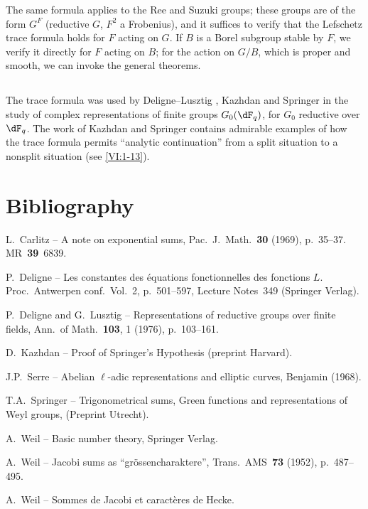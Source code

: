 \documentclass[oneside]{book}
\newcounter{char}
\theoremstyle{sga-source}
\theoremstyle{sga-source-dash}
\theoremstyle{sga-source-dotdash}
\theoremstyle{sga-source-number-note-dash}
\theoremstyle{sga-source-note-number-dotdash}
\theoremstyle{sga-source-example-dotdash}
\theoremstyle{sga-source-inline-number}
\theoremstyle{sga-source-bare-number}
\theoremstyle{sga-source}
\newcommand{\PrintPage}[1]{}\newcommand{\MathPage}[1]{}\newcommand{\PrintCite}[2]{#1}\newcommand{\var}[3]{#2}
\begin{document}
\PrintPage{231}
The same formula applies to the Ree and Suzuki groups; these groups are 
of the form $G^F$ (reductive $G$, $F^2$ a Frobenius), and it suffices to 
verify that the Lefschetz trace formula holds for $F$ acting 
on $G$. If $B$ is a Borel subgroup stable by $F$, we verify it 
directly for $F$ acting on $B$; for the action on $G/B$, which is proper and 
smooth, we can invoke the general theorems. 





\subsection{}\label{VI:8-3}

The trace formula was used by Deligne--Lusztig \cite{dl76}, 
Kazhdan \cite{ka77} and Springer \cite{sp76} in the study of 
complex representations of finite groups $G_0(\dF_q)$, for $G_0$ 
reductive over $\dF_q$. The work of Kazhdan and Springer contains 
admirable examples of how the trace formula permits ``analytic 
continuation'' from a split situation to a nonsplit situation 
(see \ref{VI:1-13}).

\PrintPage{232}
\section*{Bibliography}
\begin{enumerate}[{[}1{]}]
\item L.~Carlitz -- A note on exponential sums, Pac.~J.~Math.~\textbf{30} (1969), p.~35--37. MR~\textbf{39}~6839.
\item P.~Deligne -- Les constantes des équations fonctionnelles des fonctions $L$.
Proc.~Antwerpen conf.~Vol.~2, p.~501--597, Lecture Notes~349 (Springer Verlag).
\item P.~Deligne and G.~Lusztig -- Representations of reductive groups over finite fields,
Ann.~of Math.~\textbf{103}, 1 (1976), p.~103--161.
\item D.~Kazhdan -- Proof of Springer's Hypothesis (preprint Harvard).
\item J.P.~Serre -- Abelian $\ell$-adic representations and elliptic curves, Benjamin (1968).
\item T.A.~Springer -- Trigonometrical sums, Green functions and representations of
\var{Weil}{Weyl}{S45-ASTRA-S-0049} groups, (Preprint Utrecht).
\item A.~Weil -- Basic number theory, Springer Verlag.
\item A.~Weil -- Jacobi sums as ``gr\"ossencharaktere'', Trans.~AMS~\textbf{73} (1952), p.~487--495.
\item A.~Weil -- Sommes de Jacobi et caractères de Hecke.
\end{enumerate}
\end{document}
